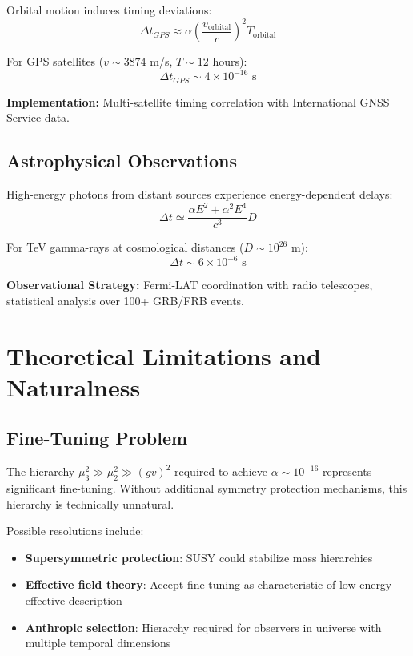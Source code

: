 \documentclass[12pt,a4paper]{article}
\begin{document}
Orbital motion induces timing deviations:
\begin{equation}
\Delta t_{GPS} \approx \alpha \left(\frac{v_{\text{orbital}}}{c}\right)^2 T_{\text{orbital}}
\label{eq:gps_timing}
\end{equation}

For GPS satellites ($v \sim 3874$ m/s, $T \sim 12$ hours):
\begin{equation}
\Delta t_{GPS} \sim 4 \times 10^{-16} \text{ s}
\end{equation}

\textbf{Implementation:} Multi-satellite timing correlation with International GNSS Service data.

\subsection{Astrophysical Observations}

High-energy photons from distant sources experience energy-dependent delays:
\begin{equation}
\Delta t \simeq \frac{\alpha E^2 + \alpha^2 E^4}{c^3} D
\label{eq:grb_delay}
\end{equation}

For TeV gamma-rays at cosmological distances ($D \sim 10^{26}$ m):
\begin{equation}
\Delta t \sim 6 \times 10^{-6} \text{ s}
\end{equation}

\textbf{Observational Strategy:} Fermi-LAT coordination with radio telescopes, statistical analysis over 100+ GRB/FRB events.

\section{Theoretical Limitations and Naturalness}
\label{sec:limitations}

\subsection{Fine-Tuning Problem}

The hierarchy $\mu_3^2 \gg \mu_2^2 \gg (gv)^2$ required to achieve $\alpha \sim 10^{-16}$ represents significant fine-tuning. Without additional symmetry protection mechanisms, this hierarchy is technically unnatural.

Possible resolutions include:
\begin{itemize}
\item \textbf{Supersymmetric protection}: SUSY could stabilize mass hierarchies
\item \textbf{Effective field theory}: Accept fine-tuning as characteristic of low-energy effective description
\item \textbf{Anthropic selection}: Hierarchy required for observers in universe with multiple temporal dimensions
\end{itemize}
\end{document}

